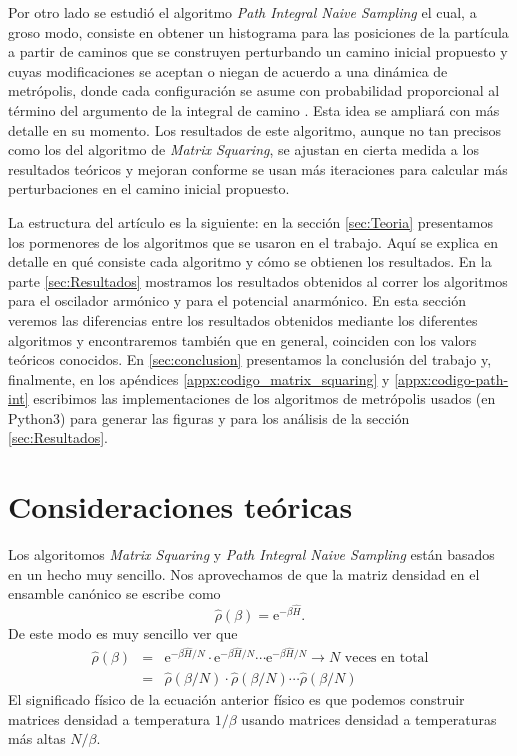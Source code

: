 \documentclass[%
 reprint,
 amsmath,amssymb,
 aps,
 pra,
]{revtex4-2}
\begin{document}
Por otro lado se estudió el algoritmo \textit{Path Integral Naive Sampling} el cual, a groso modo, consiste en obtener un histograma para las posiciones de la partícula a partir de caminos que se construyen perturbando un camino inicial propuesto y cuyas modificaciones se aceptan o niegan de acuerdo a una dinámica de metrópolis, donde cada configuración se asume con probabilidad proporcional al término del argumento de la integral de camino \cite{WernerKrauth2006}. Esta idea se ampliará con más detalle en su momento. Los resultados de este algoritmo, aunque no tan precisos como los del algoritmo de \textit{Matrix Squaring}, se ajustan en cierta medida a los resultados teóricos y mejoran conforme se usan más iteraciones para calcular más perturbaciones en el camino inicial propuesto.

La estructura del artículo es la siguiente: en la sección \ref{sec:Teoria} presentamos los pormenores de los algoritmos que se usaron en el trabajo. Aquí se explica en detalle en qué consiste cada algoritmo y cómo se obtienen los resultados. En la parte \ref{sec:Resultados} mostramos los resultados obtenidos al correr los algoritmos para el oscilador armónico y para el potencial anarmónico. En esta sección veremos las diferencias entre los resultados obtenidos mediante los diferentes algoritmos y encontraremos también que en general, coinciden con los valors teóricos conocidos. En \ref{sec:conclusion} presentamos la conclusión del trabajo y, finalmente, en los apéndices \ref{appx:codigo_matrix_squaring} y \ref{appx:codigo-path-int} escribimos las implementaciones de los algoritmos de metrópolis usados (en Python3) para generar las figuras y para los análisis de la sección \ref{sec:Resultados}.


\section{\label{sec:Teoria}Consideraciones teóricas}

Los algoritomos \textit{Matrix Squaring} y \textit{Path Integral Naive Sampling} están basados en un hecho muy sencillo. Nos aprovechamos de que la matriz densidad en el ensamble canónico se escribe como 
\begin{equation}
	\hat{\rho}(\beta) = \mathrm{e}^{-\beta \hat{H}}.
\end{equation}
De este modo es muy sencillo ver que
\begin{eqnarray}
	\hat{\rho}(\beta) 	&=& \mathrm{e}^{-\beta\hat{H}/N} \cdot \mathrm{e}^{-\beta\hat{H}/N}  \cdots \mathrm{e}^{-\beta\hat{H}/N} \rightarrow \text{$N$ veces en total} \nonumber \\
						&=& \hat{\rho}(\beta/N) \cdot \hat{\rho}(\beta/N) \cdots \hat{\rho}(\beta/N) \label{eq:convolution} 
\end{eqnarray}
El significado físico de la ecuación anterior físico es que podemos construir matrices densidad a temperatura $1/\beta$ usando matrices densidad a temperaturas más altas $N/\beta$.
	
\end{document}
